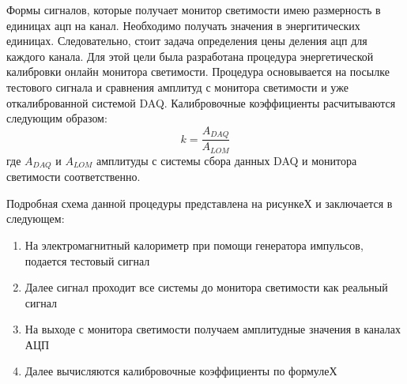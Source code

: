   Формы сигналов, которые получает монитор светимости имею размерность в единицах ацп на канал. Необходимо получать значения в энергитических единицах. Следовательно, стоит задача определения цены деления ацп для каждого канала. Для этой цели была разработана процедура энергетической калибровки онлайн монитора светимости. Процедура основывается на посылке тестового сигнала и сравнения амплитуд с монитора светимости и уже откалиброванной системой DAQ. Калибровочные коэффициенты расчитываются следующим образом:
\begin{equation}
  k = \frac{A_{DAQ}}{A_{LOM}}
\end{equation}
 где $A_{DAQ}$ и $A_{LOM}$ амплитуды с системы сбора данных DAQ и монитора светимости соответственно.\par
  Подробная схема данной процедуры представлена на рисункеХ и заключается в следующем:
\begin{enumerate}
  \item На электромагнитный калориметр при помощи генератора импульсов, подается тестовый сигнал
  \item Далее сигнал проходит все системы до монитора светимости как реальный сигнал
  \item На выходе с монитора светимости получаем амплитудные значения в каналах АЦП
  \item Далее вычисляются калибровочные коэффициенты по формулеХ
\end{enumerate} 

